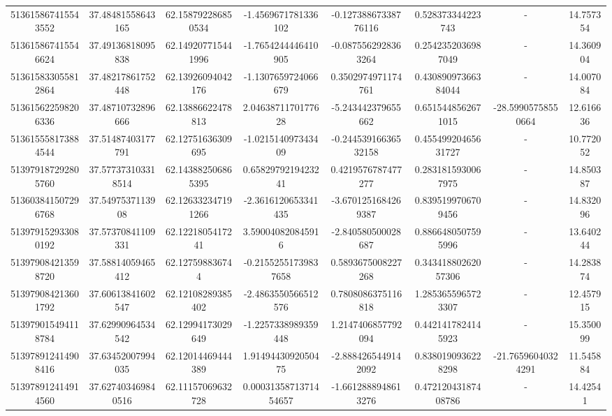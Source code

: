 \documentclass{article}
\begin{document}
\begin{landscape}
\begin{longtable}[c]{S[table-format=18.0]S[table-format=2.15]S[table-format=2.15]S[table-format=-2.17]S[table-format=-2.16]S[table-format=-2.16]S[table-format=-3.16]S[table-format=2.7]}
513615867415543552 & 37.48481558643165  & 62.158792286850534 & -1.4569671781336102   & -0.12738867338776116  & 0.528373344223743   & {-}                  & 14.757354  \\
513615867415546624 & 37.49136818095838  & 62.149207715441996 & -1.7654244446410905   & -0.0875562928363264   & 0.2542352036987049  & {-}                  & 14.360904  \\
513615833055812864 & 37.48217861752448  & 62.13926094042176  & -1.1307659724066679   & 0.3502974971174761    & 0.43089097366384044 & {-}                  & 14.007084  \\
513615622598206336 & 37.48710732896666  & 62.13886622478813  & 2.0463871170177628    & -5.243442379655662    & 0.6515448562671015  & -28.59905758550664  & 12.616636  \\
513615558173884544 & 37.51487403177791  & 62.12751636309695  & -1.021514097343409    & -0.24453916636532158  & 0.45549920465631727 & {-}                  & 10.772052  \\
513979187292805760 & 37.577373103318514 & 62.143882506865395 & 0.6582979219423241    & 0.4219576787477277    & 0.2831815930067975  & {-}                  & 14.850387  \\
513603841507296768 & 37.5497537113908   & 62.126332347191266 & -2.3616120653341435   & -3.6701251684269387   & 0.8395199706709456  & {-}                  & 14.832096  \\
513979152933080192 & 37.57370841109331  & 62.1221805417241   & 3.590040820845916     & -2.840580500028687    & 0.8866480507595996  & {-}                  & 13.640244  \\
513979084213598720 & 37.58814059465412  & 62.127598836744    & -0.21552551739837658  & 0.5893675008227268    & 0.34341880262057306 & {-}                  & 14.283874  \\
513979084213601792 & 37.60613841602547  & 62.12108289385402  & -2.4863550566512576   & 0.7808086375116818    & 1.2853655965723307  & {-}                  & 12.457915  \\
513979015494118784 & 37.62990964534542  & 62.12994173029649  & -1.2257338989359448   & 1.2147406857792094    & 0.4421417824145923  & {-}                  & 15.350099  \\
513978912414908416 & 37.63452007994035  & 62.12014469444389  & 1.9149443092050475    & -2.8884265449142092   & 0.8380190936228298  & -21.76596040324291  & 11.545884  \\
513978912414914560 & 37.627403469840516 & 62.11157069632728  & 0.0003135871371454657 & -1.6612888948613276   & 0.47212043187408786 & {-}                  & 14.42541   \\

\end{longtable}
\end{landscape}
\end{document}
